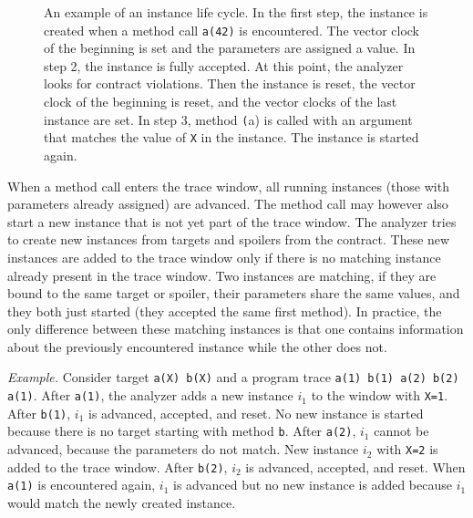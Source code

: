 \begin{figure}[hbt]
    \begin{center}
        \label{instanceLifeCycle}
        
        
        
        
        \caption{An example of an instance life cycle. In the first step, the
        instance is created when a method call \texttt{a(42)} is encountered.
        The vector clock of the beginning is set and the parameters are assigned
        a value. In step 2, the instance is fully accepted. At this point, the
        analyzer looks for contract violations. Then the instance is reset, the
        vector clock of the beginning is reset, and the vector clocks of the
        last instance are set. In step 3, method \texttt(a) is called with an
        argument that matches the value of \texttt{X} in the instance. The
        instance is started again.}
    \end{center}
\end{figure}

When a method call enters the trace window, all running instances (those with
parameters already assigned) are advanced. The method call may however also
start a new instance that is not yet part of the trace window. The analyzer
tries to create new instances from targets and spoilers from the contract. These
new instances are added to the trace window only if there is no matching
instance already present in the trace window. Two instances are matching, if
they are bound to the same target or spoiler, their parameters share the same
values, and they both just started (they accepted the same first method). In
practice, the only difference between these matching instances is that one
contains information about the previously encountered instance while the other
does not.

\emph{Example.} Consider target \texttt{a(X) b(X)} and a program trace
\texttt{a(1) b(1) a(2) b(2) a(1)}. After \texttt{a(1)}, the analyzer adds a new
instance $i_1$ to the window with \texttt{X=1}. After \texttt{b(1)}, $i_1$ is
advanced, accepted, and reset. No new instance is started because there is no
target starting with method \texttt{b}. After \texttt{a(2)}, $i_1$ cannot be
advanced, because the parameters do not match. New instance $i_2$ with
\texttt{X=2} is added to the trace window. After \texttt{b(2)}, $i_2$ is
advanced, accepted, and reset.  When \texttt{a(1)} is encountered again, $i_1$
is advanced but no new instance is added because $i_1$ would match the newly
created instance.

